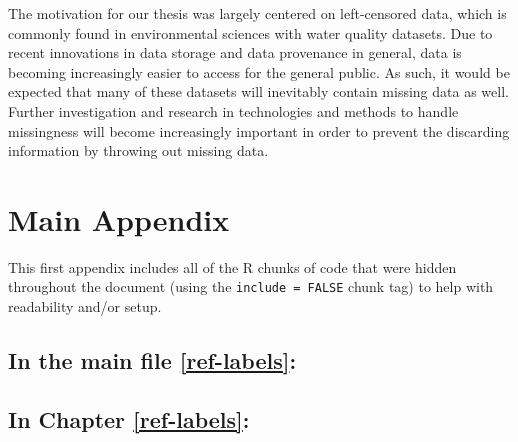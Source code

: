 \documentclass[12pt, twoside]{amherstthesis}
\begin{document}
The motivation for our thesis was largely centered on left-censored data, which is commonly found in environmental sciences with water quality datasets. Due to recent innovations in data storage and data provenance in general, data is becoming increasingly easier to access for the general public. As such, it would be expected that many of these datasets will inevitably contain missing data as well. Further investigation and research in technologies and methods to handle missingness will become increasingly important in order to prevent the discarding information by throwing out missing data.

\appendix

\hypertarget{main-appendix}{%
\chapter{Main Appendix}\label{main-appendix}}

This first appendix includes all of the R chunks of code that were hidden throughout the document (using the \texttt{include\ =\ FALSE} chunk tag) to help with readability and/or setup.

\hypertarget{in-the-main-file-refref-labels}{%
\section{In the main file \ref{ref-labels}:}\label{in-the-main-file-refref-labels}}

\hypertarget{in-chapter-refref-labels}{%
\section{In Chapter \ref{ref-labels}:}\label{in-chapter-refref-labels}}
\end{document}
